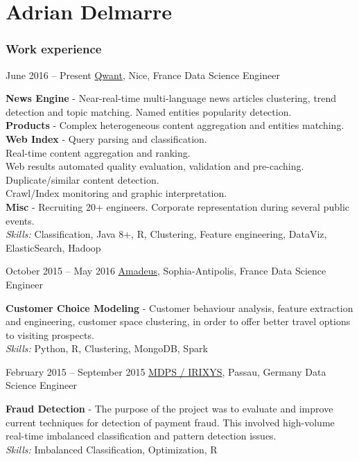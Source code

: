 \documentclass{tccv}
\renewcommand{\it}{\textit}
\renewcommand{\bf}{\textbf}
\begin{document}
\part{Adrian Delmarre}

\section{Work experience}

\begin{eventlist}

\item{June 2016 -- Present}
    {\href{https://www.qwant.com}{Qwant}, Nice, France}
    {Data Science Engineer}

\bf{News Engine} - Near-real-time multi-language news articles clustering, trend detection and topic matching. Named entities popularity detection.\\
\bf{Products} - Complex heterogeneous content aggregation and entities matching.\\
\bf{Web Index} - Query parsing and classification. \\
Real-time content aggregation and ranking.\\
Web results automated quality evaluation, validation and pre-caching.\\
Duplicate/similar content detection.\\
Crawl/Index monitoring and graphic interpretation.\\
\bf{Misc} - Recruiting 20+ engineers. Corporate representation during several public events.\\
\it{Skills:} Classification, Java 8+, R, Clustering, Feature engineering, DataViz, ElasticSearch, Hadoop

\item{October 2015 -- May 2016}
    {\href{http://www.amadeus.com/}{Amadeus}, Sophia-Antipolis, France}
    {Data Science Engineer}

\bf{Customer Choice Modeling} - Customer behaviour analysis, feature extraction and engineering, customer space clustering, in order to offer better travel options to visiting prospects.\\
\it{Skills:} Python, R, Clustering, MongoDB, Spark

\item{February 2015 -- September 2015}
    {\href{http://irixys.org/}{MDPS / IRIXYS}, Passau, Germany}
    {Data Science Engineer}

\bf{Fraud Detection} - The purpose of the project was to evaluate and improve current techniques for detection of payment fraud. This involved high-volume real-time imbalanced classification and pattern detection issues.\\
\it{Skills:} Imbalanced Classification, Optimization, R


\end{eventlist}
\end{document}
